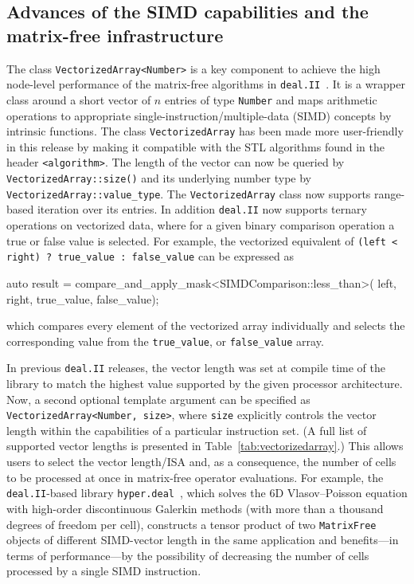 \documentclass{ansarticle-preprint}
\newcommand{\specialword}[1]{\texttt{#1}}
\newcommand{\dealii}{{\specialword{deal.II}}\xspace}
\begin{document}
\subsection{Advances of the SIMD capabilities and the matrix-free infrastructure}
\label{subsec:mf}


The class \texttt{VectorizedArray<Number>} is a key component to achieve
the high node-level performance of the matrix-free algorithms in
\dealii{}~\cite{KronbichlerKormann2012, KronbichlerKormann2019}. It is a
wrapper class around a short vector of $n$ entries of type \texttt{Number}
and maps arithmetic operations to appropriate
single-instruction/multiple-data (SIMD) concepts by intrinsic functions.
The class \texttt{VectorizedArray} has been made more user-friendly in this
release by making it compatible with the STL algorithms found in the header
\texttt{<algorithm>}. The length of the  vector can now be queried by
\texttt{VectorizedArray::size()} and its underlying number type by
\texttt{VectorizedArray::value\_type}. The \texttt{VectorizedArray} class
now supports range-based iteration over its entries. In addition \dealii{}
now supports ternary operations on vectorized data, where for a given
binary comparison operation a true or false value is selected. For example,
the vectorized equivalent of \texttt{(left < right) ? true\_value :
  false\_value} can be expressed as
\begin{c++}
auto result = compare_and_apply_mask<SIMDComparison::less_than>(
left, right, true_value, false_value);
\end{c++}
which compares every element of the vectorized array individually and
selects the corresponding value from the \texttt{true\_value}, or
\texttt{false\_value} array.

In previous \dealii{} releases, the vector length was set at compile time
of the library to match the highest value supported by the given processor
architecture. Now, a second optional template argument can be specified as
\texttt{VectorizedArray<Number, size>}, where \texttt{size} explicitly
controls the vector length within the capabilities of a particular
instruction set. (A full list of supported vector lengths is presented in
Table~\ref{tab:vectorizedarray}.) This allows users to select the vector
length/ISA and, as a consequence, the number of cells to be processed at
once in matrix-free operator evaluations. For example, the \dealii{}-based
library \texttt{hyper.deal}~\cite{munch2020hyperdeal}, which solves the 6D
Vlasov--Poisson equation with high-order discontinuous Galerkin methods
(with more than a thousand degrees of freedom per cell), constructs a
tensor product of two \texttt{MatrixFree} objects of different SIMD-vector
length in the same application and benefits---in terms of performance---by
the possibility of decreasing the number of cells processed by a single
SIMD instruction.
\end{document}
